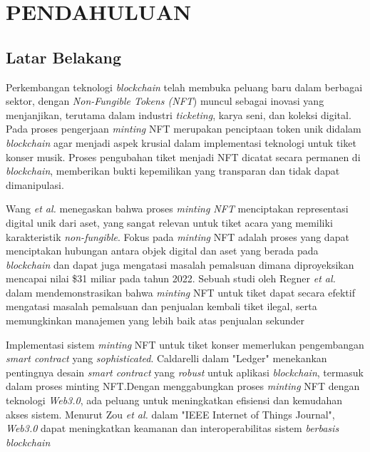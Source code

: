 \chapter{PENDAHULUAN}

\section{Latar Belakang}

    

Perkembangan teknologi \textit{blockchain} telah membuka peluang baru dalam berbagai sektor, dengan \textit{Non-Fungible Tokens (NFT}) muncul sebagai inovasi yang menjanjikan, terutama dalam industri \textit{ticketing}, karya seni, dan koleksi digital. Pada proses pengerjaan \textit{minting} NFT merupakan penciptaan token unik didalam \textit{blockchain} agar menjadi aspek krusial dalam implementasi teknologi untuk tiket konser musik. Proses pengubahan tiket menjadi NFT dicatat secara permanen di \textit{blockchain}, memberikan bukti kepemilikan yang transparan dan tidak dapat dimanipulasi.

Wang \textit{et al.}  menegaskan bahwa proses \textit{minting NFT }menciptakan representasi digital unik dari aset, yang sangat relevan untuk tiket acara yang memiliki karakteristik \textit{non-fungible}\cite{ref1}. Fokus pada\textit{ minting} NFT adalah proses yang dapat menciptakan hubungan antara objek digital dan aset yang berada pada \textit{blockchain} dan dapat juga mengatasi masalah pemalsuan dimana diproyeksikan mencapai nilai \$31 miliar pada tahun 2022\cite{ref2}. Sebuah studi oleh Regner \textit{et al.}  dalam mendemonstrasikan bahwa \textit{minting} NFT untuk tiket dapat secara efektif mengatasi masalah pemalsuan dan penjualan kembali tiket ilegal, serta memungkinkan manajemen yang lebih baik atas penjualan sekunder\parencite{ref3}

Implementasi sistem \textit{minting} NFT untuk tiket konser memerlukan pengembangan \textit{smart contract} yang \textit{sophisticated}. Caldarelli  dalam "Ledger" menekankan pentingnya desain \textit{smart contract} yang \textit{robust} untuk aplikasi \textit{blockchain}, termasuk dalam proses minting NFT\cite{ref4}.Dengan menggabungkan proses \textit{minting} NFT dengan teknologi \textit{Web3.0}, ada peluang untuk meningkatkan efisiensi dan kemudahan akses sistem. Menurut Zou \textit{et al.} dalam "IEEE Internet of Things Journal", \textit{Web3.0 }dapat meningkatkan keamanan dan interoperabilitas sistem \textit{berbasis} \textit{blockchain}\parencite{ref5}

